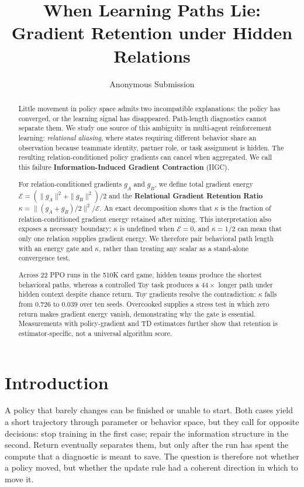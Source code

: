 \documentclass[letterpaper]{article}
\title{When Learning Paths Lie:\\Gradient Retention under Hidden Relations}
\author{Anonymous Submission}
\begin{document}
\maketitle

\begin{abstract}
Little movement in policy space admits two incompatible explanations: the policy has converged, or the learning signal has disappeared.
Path-length diagnostics cannot separate them.
We study one source of this ambiguity in multi-agent reinforcement learning: \emph{relational aliasing}, where states requiring different behavior share an observation because teammate identity, partner role, or task assignment is hidden.
The resulting relation-conditioned policy gradients can cancel when aggregated.
We call this failure \textbf{Information-Induced Gradient Contraction} (IIGC).

For relation-conditioned gradients $g_A$ and $g_B$, we define total gradient energy
$\mathcal{E}=(\|g_A\|^2+\|g_B\|^2)/2$ and the \textbf{Relational Gradient Retention Ratio}
$\kappa=\|(g_A+g_B)/2\|^2/\mathcal{E}$.
An exact decomposition shows that $\kappa$ is the fraction of relation-conditioned gradient energy retained after mixing.
This interpretation also exposes a necessary boundary: $\kappa$ is undefined when $\mathcal{E}=0$, and $\kappa=1/2$ can mean that only one relation supplies gradient energy.
We therefore pair behavioral path length with an energy gate and $\kappa$, rather than treating any scalar as a stand-alone convergence test.

Across 22 PPO runs in the 510K card game, hidden teams produce the shortest behavioral paths, whereas a controlled Toy task produces a $44\times$ longer path under hidden context despite chance return.
Toy gradients resolve the contradiction: $\kappa$ falls from $0.726$ to $0.039$ over ten seeds.
Overcooked supplies a stress test in which zero return makes gradient energy vanish, demonstrating why the gate is essential.
Measurements with policy-gradient and TD estimators further show that retention is estimator-specific, not a universal algorithm score.
\end{abstract}


\section{Introduction}

A policy that barely changes can be finished or unable to start.
Both cases yield a short trajectory through parameter or behavior space, but they call for opposite decisions: stop training in the first case; repair the information structure in the second.
Return eventually separates them, but only after the run has spent the compute that a diagnostic is meant to save.
The question is therefore not whether a policy moved, but whether the update rule had a coherent direction in which to move it.
\end{document}
